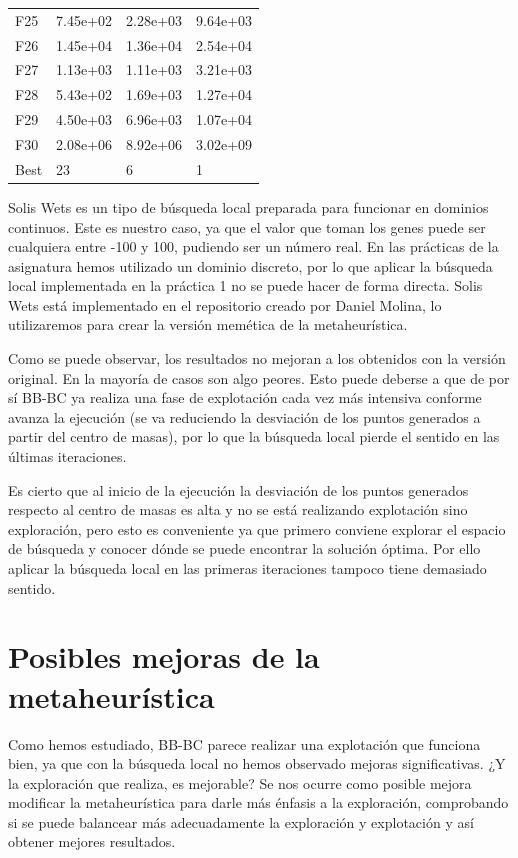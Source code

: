 \begin{table}[H]
\begin{minipage}{.5\linewidth}
\begin{tabular}{llll}
        F25  &  7.45e+02 &   2.28e+03 &  9.64e+03 \\
        F26  &  1.45e+04 &   1.36e+04 &  2.54e+04 \\
        F27  &  1.13e+03 &   1.11e+03 &  3.21e+03 \\
        F28  &  5.43e+02 &   1.69e+03 &  1.27e+04 \\
        F29  &  4.50e+03 &   6.96e+03 &  1.07e+04 \\
        F30  &  2.08e+06 &   8.92e+06 &  3.02e+09 \\
        Best &        23 &          6 &         1 \\
        \bottomrule
        \end{tabular}
        
    \end{minipage} 
\end{table}

\newpage
Solis Wets es un tipo de búsqueda local preparada para funcionar en dominios continuos. Este es nuestro caso, ya que el valor que toman los genes puede ser cualquiera entre -100 y 100, pudiendo ser un número real. En las prácticas de la asignatura hemos utilizado un dominio discreto, por lo que aplicar la búsqueda local implementada en la práctica 1 no se puede hacer de forma directa. Solis Wets está implementado en el repositorio \cite{cec_dmolina} creado por Daniel Molina, lo utilizaremos para crear la versión memética de la metaheurística.

Como se puede observar, los resultados no mejoran a los obtenidos con la versión original. En la mayoría de casos son algo peores. Esto puede deberse a que de por sí BB-BC ya realiza una fase de explotación cada vez más intensiva conforme avanza la ejecución (se va reduciendo la desviación de los puntos generados a partir del centro de masas), por lo que la búsqueda local pierde el sentido en las últimas iteraciones. 

Es cierto que al inicio de la ejecución la desviación de los puntos generados respecto al centro de masas es alta y no se está realizando explotación sino exploración, pero esto es conveniente ya que primero conviene explorar el espacio de búsqueda y conocer dónde se puede encontrar la solución óptima. Por ello aplicar la búsqueda local en las primeras iteraciones tampoco tiene demasiado sentido.

\newpage
\section{Posibles mejoras de la metaheurística}
Como hemos estudiado, BB-BC parece realizar una explotación que funciona bien, ya que con la búsqueda local no hemos observado mejoras significativas. ¿Y la exploración que realiza, es mejorable? Se nos ocurre como posible mejora modificar la metaheurística para darle más énfasis a la exploración, comprobando si se puede balancear más adecuadamente la exploración y explotación y así obtener mejores resultados.

